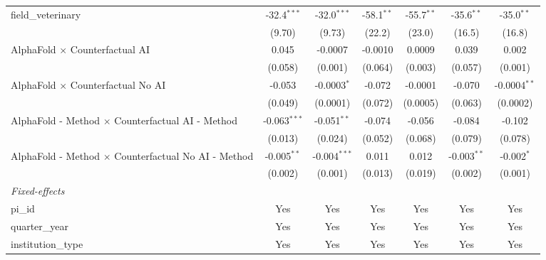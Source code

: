 \begin{tabular}{lcccccc}
   field\_veterinary                                           & -32.4$^{***}$  & -32.0$^{***}$  & -58.1$^{**}$  & -55.7$^{**}$  & -35.6$^{**}$   & -35.0$^{**}$\\   
                                                               & (9.70)         & (9.73)         & (22.2)        & (23.0)        & (16.5)         & (16.8)\\   
   AlphaFold $\times$ Counterfactual AI                        & 0.045          & -0.0007        & -0.0010       & 0.0009        & 0.039          & 0.002\\   
                                                               & (0.058)        & (0.001)        & (0.064)       & (0.003)       & (0.057)        & (0.001)\\   
   AlphaFold $\times$ Counterfactual No AI                     & -0.053         & -0.0003$^{*}$  & -0.072        & -0.0001       & -0.070         & -0.0004$^{**}$\\   
                                                               & (0.049)        & (0.0001)       & (0.072)       & (0.0005)      & (0.063)        & (0.0002)\\   
   AlphaFold - Method $\times$ Counterfactual AI - Method      & -0.063$^{***}$ & -0.051$^{**}$  & -0.074        & -0.056        & -0.084         & -0.102\\   
                                                               & (0.013)        & (0.024)        & (0.052)       & (0.068)       & (0.079)        & (0.078)\\   
   AlphaFold - Method $\times$ Counterfactual No AI - Method   & -0.005$^{**}$  & -0.004$^{***}$ & 0.011         & 0.012         & -0.003$^{**}$  & -0.002$^{*}$\\   
                                                               & (0.002)        & (0.001)        & (0.013)       & (0.019)       & (0.002)        & (0.001)\\   
   \midrule
   \emph{Fixed-effects}\\
   pi\_id                                                      & Yes            & Yes            & Yes           & Yes           & Yes            & Yes\\  
   quarter\_year                                               & Yes            & Yes            & Yes           & Yes           & Yes            & Yes\\  
   institution\_type                                           & Yes            & Yes            & Yes           & Yes           & Yes            & Yes\\  

\end{tabular}
